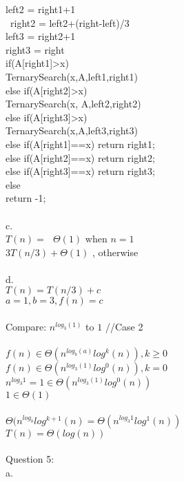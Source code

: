 \documentclass[12pt]{article}
\newcommand\tab[1][1cm]{\hspace*{#1}}
\begin{document}
\tab\tab\tab left2 = right1+1\\
\tab\tab\tab\ right2 = left2+(right-left)/3\\
\tab\tab\tab left3 = right2+1\\
\tab\tab\tab right3 = right\\
\tab\tab\tab if(A[right1]>x)\\
\tab\tab\tab\tab TernarySearch(x,A,left1,right1)\\
\tab\tab\tab else if(A[right2]>x)\\
\tab\tab\tab\tab TernarySearch(x, A,left2,right2)\\
\tab\tab\tab else if(A[right3]>x)\\
\tab\tab\tab\tab TernarySearch(x,A,left3,right3)\\
\tab\tab\tab else if(A[right1]==x) return right1;\\
\tab\tab\tab else if(A[right2]==x) return right2;\\
\tab\tab\tab else if(A[right3]==x) return right3;\\
\tab\tab\tab else\\
\tab\tab\tab\tab return -1;\\\\
\tab\tab c.\\
\tab\tab $T(n) = \:\:\:\Theta(1)$ when  $n=1$\\
\tab\tab\tab\tab $3T(n/3)+\Theta(1)$ , otherwise\\\\
\tab\tab d.\\
\tab\tab $T(n) = T(n/3) +c$\\
\tab\tab\tab $a=1 , b=3, f(n)=c$\\\\
\tab\tab Compare: $n^{log_3(1)}$ to $1$ //Case 2\\\\
\tab\tab $f(n) \in \Theta (n^{log_b(a)} log^k(n)), k\ge0$\\
\tab\tab $f(n) \in \Theta (n^{log_3(1)} log^0(n)), k=0$\\
\tab\tab $n^{log_3 1} = 1 \in \Theta (n^{log_3(1)} log^0(n))$\\
\tab\tab $1 \in \Theta(1)$\\\\
\tab\tab $\Theta (n^{log_b}log^{k+1}(n) = \Theta(n^{log_3 1} log^1(n))$\\
\tab\tab $T(n) = \Theta(log(n))$\\\\
Question 5:\\
\tab\tab a.\\
\end{document}
